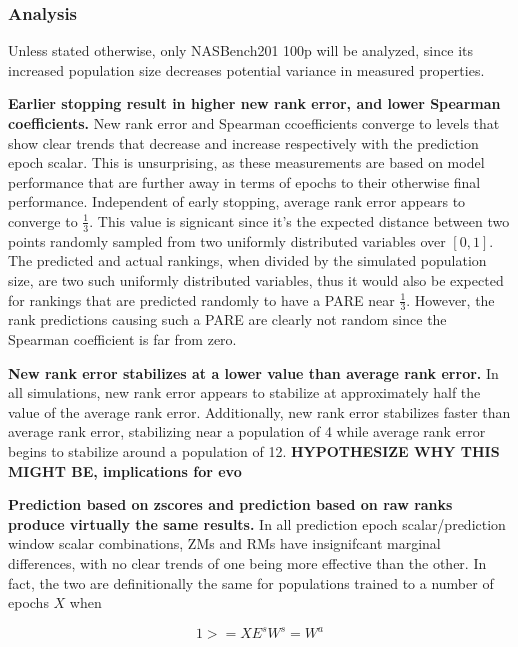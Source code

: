 \documentclass[twocolumn]{article}
\begin{document}
\subsubsection{Analysis}

Unless stated otherwise, only NASBench201 100p will be analyzed, since its increased population size decreases potential variance in measured properties.

\textbf{Earlier stopping result in higher new rank error, and lower Spearman coefficients.}
New rank error and Spearman ccoefficients converge to levels that show clear trends that decrease and increase respectively with the prediction epoch scalar.
This is unsurprising, as these measurements are based on model performance that are further away in terms of epochs to their
otherwise final performance. 
Independent of early stopping, average rank error appears to converge to $\frac{1}{3}$.
This value is signicant since it's the expected distance between two points randomly sampled from two uniformly distributed variables over $[0, 1]$.
The predicted and actual rankings, when divided by the simulated population size, are two such uniformly distributed variables, 
thus it would also be expected for rankings that are predicted randomly to have a PARE near $\frac{1}{3}$.
However, the rank predictions causing such a PARE are clearly not random since the Spearman coefficient is far from zero.

\textbf{New rank error stabilizes at a lower value than average rank error.}
In all simulations, new rank error appears to stabilize at approximately half the value of the average rank error.
Additionally, new rank error stabilizes faster than average rank error, stabilizing near a population of 4 while
average rank error begins to stabilize around a population of 12.
\textbf{HYPOTHESIZE WHY THIS MIGHT BE, implications for evo}

\textbf{Prediction based on zscores and prediction based on raw ranks produce virtually the same results.}
In all prediction epoch scalar/prediction window scalar combinations, ZMs and RMs have insignifcant marginal differences,
with no clear trends of one being more effective than the other.
In fact, the two are definitionally the same for populations trained to a number of epochs $X$ when

\[1 >= XE^{s}W^{s} = W^{a}\]
\end{document}

